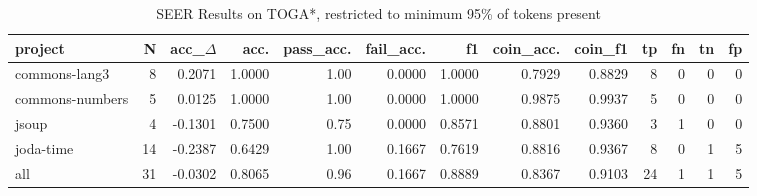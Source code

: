 \begin{table*}
\centering
\caption{SEER Results on TOGA*, restricted to minimum 95\% of tokens present}
\label{tab:toga_results_05}
\begin{tabular}{lrrrrrrrrrrrr}
\toprule
         project &   N &  acc\_$\Delta$ &    acc. &  pass\_acc. &  fail\_acc. &      f1 &  coin\_acc. &  coin\_f1 &  tp &  fn &  tn &  fp \\
\midrule
   commons-lang3 &   8 &      0.2071 &  1.0000 &       1.00 &     0.0000 &  1.0000 &     0.7929 &   0.8829 &   8 &   0 &   0 &   0 \\
 commons-numbers &   5 &      0.0125 &  1.0000 &       1.00 &     0.0000 &  1.0000 &     0.9875 &   0.9937 &   5 &   0 &   0 &   0 \\
           jsoup &   4 &     -0.1301 &  0.7500 &       0.75 &     0.0000 &  0.8571 &     0.8801 &   0.9360 &   3 &   1 &   0 &   0 \\
       joda-time &  14 &     -0.2387 &  0.6429 &       1.00 &     0.1667 &  0.7619 &     0.8816 &   0.9367 &   8 &   0 &   1 &   5 \\
             all &  31 &     -0.0302 &  0.8065 &       0.96 &     0.1667 &  0.8889 &     0.8367 &   0.9103 &  24 &   1 &   1 &   5 \\
\bottomrule
\end{tabular}
\end{table*}
